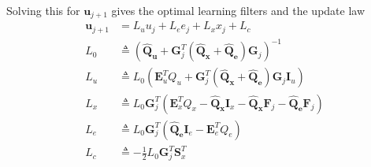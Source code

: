 \documentclass[landscape]{article}
\begin{document}
Solving this for $\mathbf{u}_{j+1}$ gives the optimal learning filters and the update law
\begin{align}
\mathbf{u}_{j+1} & = L_u u_j + L_e e_j + L_x x_j + L_c\\
L_0 & \triangleq \left(\mathbf{\hat{Q}_u} + \mathbf{G}_j^T \left(\mathbf{\hat{Q}_x} + \mathbf{\hat{Q}_e} \right)\mathbf{G}_j \right)^{-1}\\
L_u & \triangleq L_0\left(\mathbf{E}_u^T Q_u + \mathbf{G}_j^T \left(\mathbf{\hat{Q}_x} +  \mathbf{\hat{Q}_e} \right) \mathbf{G}_j \mathbf{I}_u \right)\\
L_x & \triangleq L_0\mathbf{G}_j^T\left(\mathbf{E}_x^T Q_x - \mathbf{\hat{Q}_x} \mathbf{I}_x  - \mathbf{\hat{Q}_x} \mathbf{F}_j  - \mathbf{\hat{Q}_e} \mathbf{F}_j \right)\\
L_e & \triangleq L_0 \mathbf{G}_j^T \left( \mathbf{\hat{Q}_e} \mathbf{I}_e - \mathbf{E}_e^T Q_e \right)\\
L_c & \triangleq -\frac{1}{2}L_0\mathbf{G}_j^T\mathbf{S}_x^T
\end{align}
\end{document}
